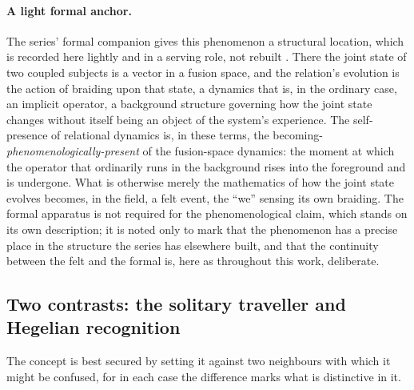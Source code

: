 \paragraph{A light formal anchor.}
The series' formal companion gives this phenomenon a structural location, which is recorded here lightly and in a serving role, not rebuilt \parencite{wan2026braid}. There the joint state of two coupled subjects is a vector in a fusion space, and the relation's evolution is the action of braiding upon that state, a dynamics that is, in the ordinary case, an implicit operator, a background structure governing how the joint state changes without itself being an object of the system's experience. The self-presence of relational dynamics is, in these terms, the becoming-\emph{phenomenologically-present} of the fusion-space dynamics: the moment at which the operator that ordinarily runs in the background rises into the foreground and is undergone. What is otherwise merely the mathematics of how the joint state evolves becomes, in the field, a felt event, the ``we'' sensing its own braiding. The formal apparatus is not required for the phenomenological claim, which stands on its own description; it is noted only to mark that the phenomenon has a precise place in the structure the series has elsewhere built, and that the continuity between the felt and the formal is, here as throughout this work, deliberate.

\subsection{Two contrasts: the solitary traveller and Hegelian recognition}
\label{p21:sub:sp-contrasts}

The concept is best secured by setting it against two neighbours with which it might be confused, for in each case the difference marks what is distinctive in it.

